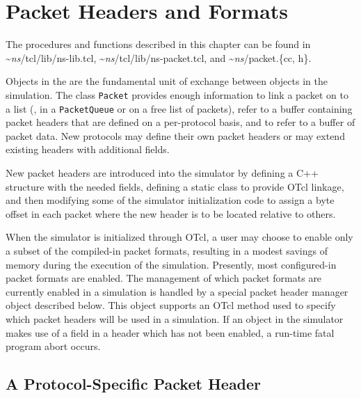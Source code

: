 \chapter{Packet Headers and Formats}
\label{chap:pformat}

The procedures and functions described in this chapter can be found in
\textasciitilde\emph{ns}/{tcl/lib/ns-lib.tcl},
\textasciitilde\emph{ns}/{tcl/lib/ns-packet.tcl}, and \textasciitilde\emph{ns}/{packet.\{cc, h\}}.

Objects in the  are the fundamental unit of
exchange between objects in the simulation.
The class {\tt Packet}
provides enough information to link a packet on to a list
(\ie, in a {\tt PacketQueue} or on a free list of packets),
refer to a buffer containing packet headers
that are defined on a per-protocol basis,
and to refer to a buffer of packet data.
New protocols may define their own packet headers or may extend
existing headers with additional fields.

New packet headers are introduced into the simulator
by defining a C++ structure with the needed fields,
defining a static class to provide OTcl linkage,
and then modifying some of the simulator initialization code
to assign a byte offset in each packet where the new header
is to be located relative to others.

When the simulator is initialized through OTcl,
a user may choose to enable
only a subset of the compiled-in packet formats, resulting in
a modest savings of memory during the execution of the simulation.
Presently, most configured-in packet formats are enabled.
The management of which packet formats are currently enabled
in a simulation is handled by a special packet header manager
object described below.
This object supports an OTcl method used to specify
which packet headers will be used in a simulation.
If an object in the simulator makes use of a field in a header
which has not been enabled, a run-time fatal program abort occurs.

\section{A Protocol-Specific Packet Header}
\label{sec:ppackethdr}

